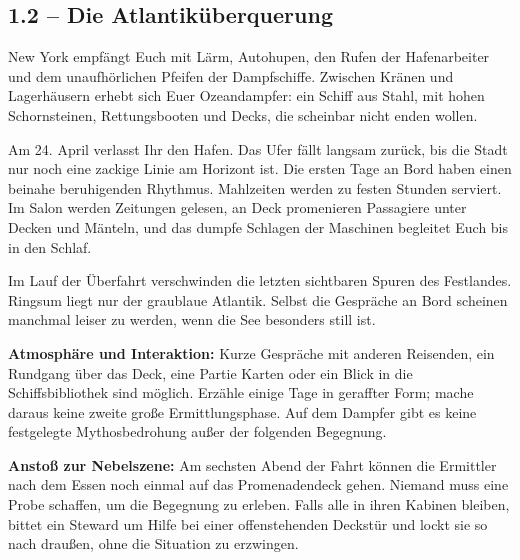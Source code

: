 \subsection{1.2 -- Die Atlantiküberquerung}
\begin{vorlesetextalle}
New York empfängt Euch mit Lärm, Autohupen, den Rufen der Hafenarbeiter und dem unaufhörlichen Pfeifen der Dampfschiffe. Zwischen Kr\"anen und Lagerhäusern erhebt sich Euer Ozeandampfer: ein Schiff aus Stahl, mit hohen Schornsteinen, Rettungsbooten und Decks, die scheinbar nicht enden wollen.

Am 24. April verlasst Ihr den Hafen. Das Ufer fällt langsam zurück, bis die Stadt nur noch eine zackige Linie am Horizont ist. Die ersten Tage an Bord haben einen beinahe beruhigenden Rhythmus. Mahlzeiten werden zu festen Stunden serviert. Im Salon werden Zeitungen gelesen, an Deck promenieren Passagiere unter Decken und Mänteln, und das dumpfe Schlagen der Maschinen begleitet Euch bis in den Schlaf.

Im Lauf der Überfahrt verschwinden die letzten sichtbaren Spuren des Festlandes. Ringsum liegt nur der graublaue Atlantik. Selbst die Gespräche an Bord scheinen manchmal leiser zu werden, wenn die See besonders still ist.
\end{vorlesetextalle}
\begin{meisterinfo}
\textbf{Atmosphäre und Interaktion:} Kurze Gespräche mit anderen Reisenden, ein Rundgang über das Deck, eine Partie Karten oder ein Blick in die Schiffsbibliothek sind möglich. Erzähle einige Tage in geraffter Form; mache daraus keine zweite gro\ss{}e Ermittlungsphase. Auf dem Dampfer gibt es keine festgelegte Mythosbedrohung au\ss{}er der folgenden Begegnung.

\textbf{Ansto\ss{} zur Nebelszene:} Am sechsten Abend der Fahrt können die Ermittler nach dem Essen noch einmal auf das Promenadendeck gehen. Niemand muss eine Probe schaffen, um die Begegnung zu erleben. Falls alle in ihren Kabinen bleiben, bittet ein Steward um Hilfe bei einer offenstehenden Deckstür und lockt sie so nach drau\ss{}en, ohne die Situation zu erzwingen.
\end{meisterinfo}

